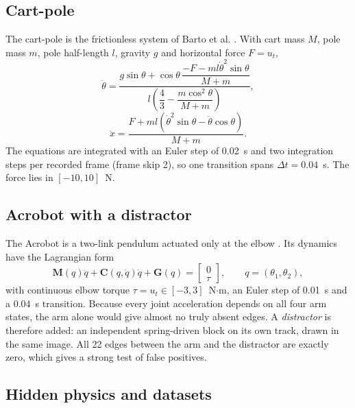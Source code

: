 \documentclass[11pt, a4paper, oneside,enumerate,textcomp]{report}
\begin{document}
\subsection{Cart-pole}

The cart-pole is the frictionless system of Barto et al. \cite{barto1983cartpole}. With cart mass $M$, pole mass $m$, pole half-length $l$, gravity $g$ and horizontal force $F = u_t$,
\begin{equation}
\ddot{\theta} = \frac{g\sin\theta + \cos\theta \, \dfrac{-F - m l \dot{\theta}^2 \sin\theta}{M+m}}{l\left(\dfrac{4}{3} - \dfrac{m\cos^2\theta}{M+m}\right)},
\label{eq:cp_theta}
\end{equation}
\begin{equation}
\ddot{x} = \frac{F + m l\left(\dot{\theta}^2\sin\theta - \ddot{\theta}\cos\theta\right)}{M+m}.
\label{eq:cp_x}
\end{equation}
The equations are integrated with an Euler step of 0.02~s and two integration steps per recorded frame (frame skip 2), so one transition spans $\Delta t = 0.04$~s. The force lies in $[-10, 10]$~N.

\subsection{Acrobot with a distractor}

The Acrobot is a two-link pendulum actuated only at the elbow \cite{spong1995swingup}. Its dynamics have the Lagrangian form
\begin{equation}
\mathbf{M}(q)\ddot{q} + \mathbf{C}(q,\dot{q})\dot{q} + \mathbf{G}(q) = \begin{bmatrix} 0 \\ \tau \end{bmatrix}, \qquad q = (\theta_1, \theta_2),
\label{eq:acrobot}
\end{equation}
with continuous elbow torque $\tau = u_t \in [-3, 3]$~N$\cdot$m, an Euler step of 0.01~s and a 0.04~s transition. Because every joint acceleration depends on all four arm states, the arm alone would give almost no truly absent edges. A \emph{distractor} is therefore added: an independent spring-driven block on its own track, drawn in the same image. All 22 edges between the arm and the distractor are exactly zero, which gives a strong test of false positives.

\subsection{Hidden physics and datasets}
\end{document}
